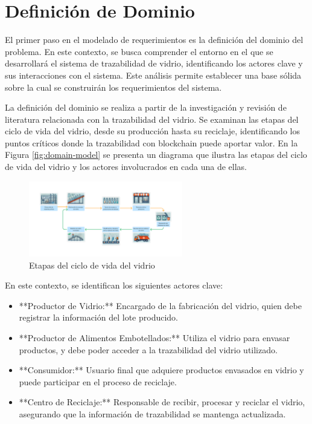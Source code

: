 \section{Definición de Dominio}
\label{sec:domain-definition}


El primer paso en el modelado de requerimientos es la definición del dominio del problema. En este contexto, se busca comprender el entorno en el que se desarrollará el sistema de trazabilidad de vidrio, identificando los actores clave y sus interacciones con el sistema. Este análisis permite establecer una base sólida sobre la cual se construirán los requerimientos del sistema.

La definición del dominio se realiza a partir de la investigación y revisión de literatura relacionada con la trazabilidad del vidrio. Se examinan las etapas del ciclo de vida del vidrio, desde su producción hasta su reciclaje, identificando los puntos críticos donde la trazabilidad con blockchain puede aportar valor. En la Figura \ref{fig:domain-model} se presenta un diagrama que ilustra las etapas del ciclo de vida del vidrio y los actores involucrados en cada una de ellas.

\begin{figure}[!htpb]
    \centering
    \includegraphics[width=0.6\textwidth]{Figures/glass-lifecycle.png}
    \caption{Etapas del ciclo de vida del vidrio}
    \label{fig:glass-lifecycle}
\end{figure}

En este contexto, se identifican los siguientes actores clave:
\begin{itemize}
		\item **Productor de Vidrio:** Encargado de la fabricación del vidrio, quien debe registrar la información del lote producido.
		\item **Productor de Alimentos Embotellados:** Utiliza el vidrio para envasar productos, y debe poder acceder a la trazabilidad del vidrio utilizado.
		\item **Consumidor:** Usuario final que adquiere productos envasados en vidrio y puede participar en el proceso de reciclaje.
		\item **Centro de Reciclaje:** Responsable de recibir, procesar y reciclar el vidrio, asegurando que la información de trazabilidad se mantenga actualizada.
\end{itemize}

